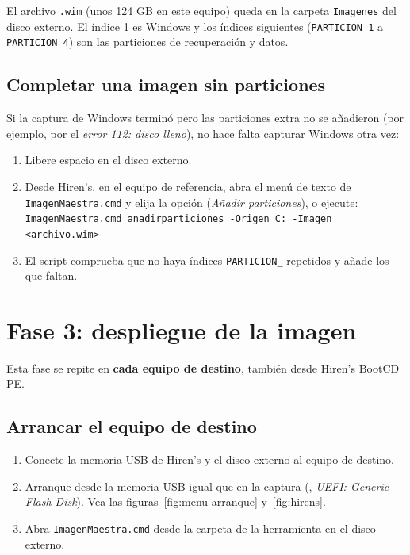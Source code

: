 \documentclass[11pt,a4paper]{report}
\newcommand{\tecla}[1]{\tcbox[on line,boxsep=1pt,left=3pt,right=3pt,top=0pt,bottom=0pt,
  colback=grisclaro,colframe=gray!60,boxrule=0.4pt,arc=2pt]{\texttt{\small #1}}}
\begin{document}
\begin{resultado}
El archivo \texttt{.wim} (unos 124 GB en este equipo) queda en la carpeta
\texttt{Imagenes} del disco externo. El índice 1 es Windows y los índices
siguientes (\texttt{PARTICION\_1} a \texttt{PARTICION\_4}) son las particiones de
recuperación y datos.
\end{resultado}

\section{Completar una imagen sin particiones}\label{sec:anadir}

Si la captura de Windows terminó pero las particiones extra no se añadieron
(por ejemplo, por el \emph{error 112: disco lleno}), no hace falta capturar
Windows otra vez:

\begin{enumerate}
  \item Libere espacio en el disco externo.
  \item Desde Hiren's, en el equipo de referencia, abra el menú de texto de
        \texttt{ImagenMaestra.cmd} y elija la opción \tecla{6}
        (\emph{Añadir particiones}), o ejecute:\\[2pt]
        \texttt{\small ImagenMaestra.cmd anadirparticiones -Origen C: -Imagen <archivo.wim>}
  \item El script comprueba que no haya índices \texttt{PARTICION\_} repetidos y
        añade los que faltan.
\end{enumerate}

\chapter{Fase 3: despliegue de la imagen}

Esta fase se repite en \textbf{cada equipo de destino}, también desde
Hiren's BootCD PE.

\section{Arrancar el equipo de destino}\label{sec:arrancar-destino}

\begin{enumerate}
  \item Conecte la memoria USB de Hiren's y el disco externo al equipo de
        destino.
  \item Arranque desde la memoria USB igual que en la captura (\tecla{F8},
        \emph{UEFI: Generic Flash Disk}). Vea las figuras~\ref{fig:menu-arranque}
        y~\ref{fig:hirens}.
  \item Abra \texttt{ImagenMaestra.cmd} desde la carpeta de la herramienta en el
        disco externo.
\end{enumerate}
\end{document}
